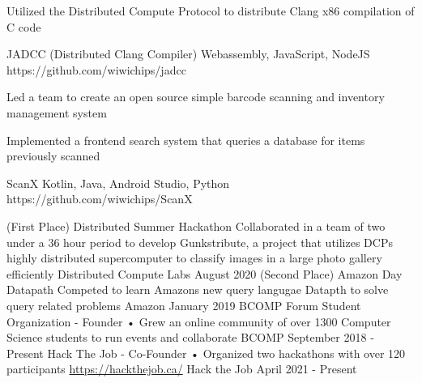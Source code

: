 \documentclass[]{awesome-cv}
\begin{document}
\vspace{-7mm}
\begin{cventries}
	\cventry
  {\begin{cvitems}
  	\item{Utilized the Distributed Compute Protocol to distribute Clang x86 compilation of C code}
  \end{cvitems}}
	{JADCC (Distributed Clang Compiler)}
	{Webassembly, JavaScript, NodeJS}
	{https://github.com/wiwichips/jadcc}
	{}
	
	\vspace{-5mm}
	\cventry
  {\begin{cvitems}
    \item{Led a team to create an open source simple barcode scanning and inventory management system}
    \item{Implemented a frontend search system that queries a database for items previously scanned}
  \end{cvitems}}
	{ScanX}
	{Kotlin, Java, Android Studio, Python}
	{https://github.com/wiwichips/ScanX}
	{}

	\vspace{-5mm}
\end{cventries}
\begin{cvhonors}
	\cvhonor
	{(First Place) Distributed Summer Hackathon}
	{Collaborated in a team of two under a 36 hour period to develop Gunkstribute, a project that utilizes DCP\textquotesingle{}s highly distributed supercomputer to classify images in a large photo gallery efficiently}
	{Distributed Compute Labs}
	{August 2020}
	\cvhonor
	{(Second Place) Amazon Day Datapath}
	{Competed to learn Amazon\textquotesingle{}s new query langugae Datapth to solve query related problems}
	{Amazon}
	{January 2019}
	\cvhonor
	{BCOMP Forum Student Organization - Founder}
	{• Grew an online community of over 1300 Computer Science students to run events and collaborate}
	{BCOMP}
	{September 2018 - Present}
  \cvhonor
  {Hack The Job - Co-Founder}
  {• Organized two hackathons with over 120 participants \href{https://hackthejob.ca/}{https://hackthejob.ca/}}
  {Hack the Job}
  {April 2021 - Present}
\end{cvhonors}
\ 
\end{document}
